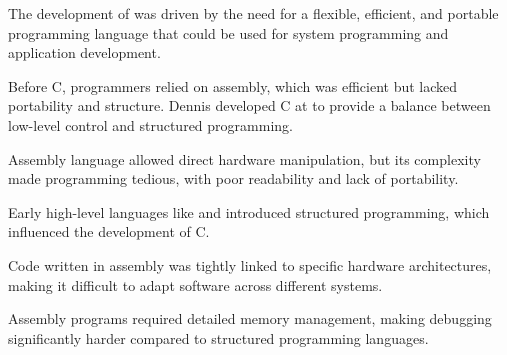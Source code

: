 \begin{NxSSSBox}
	\begin{NxIDBox}
		The development of  was driven by the need for a flexible, efficient, and portable programming language that could be used for system programming and application development.
	\end{NxIDBox}
	\begin{NxIDBoxL}
		 Before C, programmers relied on assembly, which was efficient but lacked portability and structure.
		 Dennis  developed C at  to provide a balance between low-level control and structured programming.
	\end{NxIDBoxL}
\end{NxSSSBox}

\begin{NxSSSSBox}
	\begin{NxIDBox}[title={Limitations of Assembly}]
		Assembly language allowed direct hardware manipulation, but its complexity made programming tedious, with poor readability and lack of portability.
	\end{NxIDBox}
	\begin{NxIDBox}[title={Influence of ALGOL and BCPL}]
		Early high-level languages like  and  introduced structured programming, which influenced the development of C.
	\end{NxIDBox}
\end{NxSSSSBox}

\begin{NxSSSSBox}
	\begin{NxIDBox}[title={Challenges in Portability}]
		Code written in assembly was tightly linked to specific hardware architectures, making it difficult to adapt software across different systems.
	\end{NxIDBox}
	\begin{NxIDBox}[title={Complexity in Debugging}]
		Assembly programs required detailed memory management, making debugging significantly harder compared to structured programming languages.
	\end{NxIDBox}
\end{NxSSSSBox}


